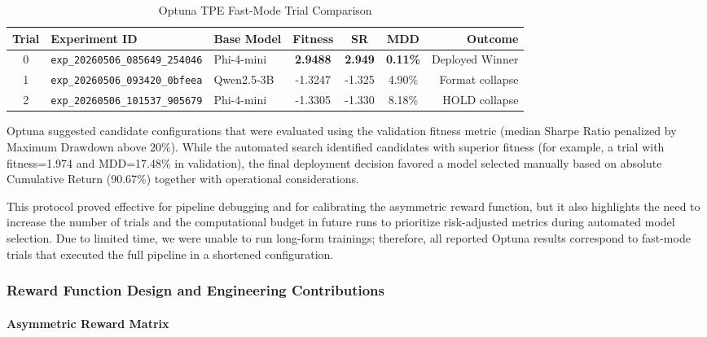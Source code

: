    \begin{table}[htbp]
    \centering
    \footnotesize
    \caption{Optuna TPE Fast-Mode Trial Comparison}
    \label{tab:optuna_trials}
    \begin{tabular}{cllcccr}
    \hline
    \textbf{Trial} & \textbf{Experiment ID} & \textbf{Base Model} & \textbf{Fitness} & \textbf{SR} & \textbf{MDD} & \textbf{Outcome} \\
    \hline
    0 & \texttt{exp\_20260506\allowbreak \_085649\_254046} & Phi-4-mini & \textbf{2.9488} & \textbf{2.949} & \textbf{0.11\%} & Deployed Winner \\
    1 & \texttt{exp\_20260506\allowbreak \_093420\_0bfeea} & Qwen2.5-3B & -1.3247 & -1.325 & 4.90\% & Format collapse \\
    2 & \texttt{exp\_20260506\allowbreak \_101537\_905679} & Phi-4-mini & -1.3305 & -1.330 & 8.18\% & HOLD collapse \\
    \hline
    \end{tabular}
    \end{table}



    Optuna suggested candidate configurations that were evaluated using the validation fitness metric (median Sharpe Ratio penalized by Maximum Drawdown above 20\%). While the automated search identified candidates with superior fitness (for example, a trial with fitness=1.974 and MDD=17.48\% in validation), the final deployment decision favored a model selected manually based on absolute Cumulative Return (90.67\%) together with operational considerations.

    This protocol proved effective for pipeline debugging and for calibrating the asymmetric reward function, but it also highlights the need to increase the number of trials and the computational budget in future runs to prioritize risk-adjusted metrics during automated model selection. Due to limited time, we were unable to run long-form trainings; therefore, all reported Optuna results correspond to fast-mode trials that executed the full pipeline in a shortened configuration.

    \subsubsection{Reward Function Design and Engineering Contributions}

    \paragraph{Asymmetric Reward Matrix}

